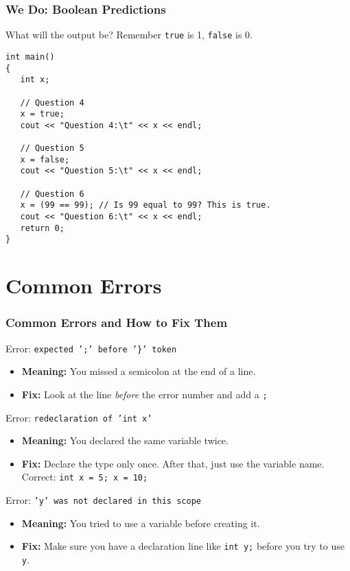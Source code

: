 \documentclass{beamer}
\begin{document}
\begin{frame}[fragile]
\frametitle{We Do: Boolean Predictions}
What will the output be? Remember \texttt{true} is 1, \texttt{false} is 0.\pause
\begin{verbatim}
int main()
{
   int x;

   // Question 4
   x = true;
   cout << "Question 4:\t" << x << endl;
   
   // Question 5
   x = false;
   cout << "Question 5:\t" << x << endl;
   
   // Question 6
   x = (99 == 99); // Is 99 equal to 99? This is true.
   cout << "Question 6:\t" << x << endl;
   return 0;
}
\end{verbatim}
\end{frame}

\section{Common Errors}

\begin{frame}
\frametitle{Common Errors and How to Fix Them}
\begin{alertblock}{Error: \texttt{expected ';' before '\}' token}}
\begin{itemize}
    \item \textbf{Meaning:} You missed a semicolon at the end of a line.
    \item \textbf{Fix:} Look at the line \textit{before} the error number and add a \texttt{;}
\end{itemize}
\end{alertblock}\pause

\begin{alertblock}{Error: \texttt{redeclaration of 'int x'}}
\begin{itemize}
    \item \textbf{Meaning:} You declared the same variable twice.
    \item \textbf{Fix:} Declare the type only once. After that, just use the variable name.\\
    Correct: \texttt{int x = 5; x = 10;}
\end{itemize}
\end{alertblock}\pause

\begin{alertblock}{Error: \texttt{'y' was not declared in this scope}}
\begin{itemize}
    \item \textbf{Meaning:} You tried to use a variable before creating it.
    \item \textbf{Fix:} Make sure you have a declaration line like \texttt{int y;} before you try to use \texttt{y}.
\end{itemize}
\end{alertblock}
\end{frame}
\end{document}
